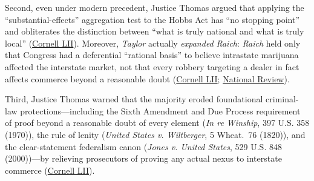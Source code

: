 \documentclass[12pt]{article}
\begin{document}
Second, even under modern precedent, Justice Thomas argued that applying the ``substantial-effects'' aggregation test to the Hobbs Act has ``no stopping point'' and obliterates the distinction between ``what is truly national and what is truly local'' (\href{https://www.law.cornell.edu/supremecourt/text/14-6166}{Cornell LII}). Moreover, \textit{Taylor} actually \textit{expanded} \textit{Raich}: \textit{Raich} held only that Congress had a deferential ``rational basis'' to believe intrastate marijuana affected the interstate market, not that every robbery targeting a dealer in fact affects commerce beyond a reasonable doubt (\href{https://www.law.cornell.edu/supremecourt/text/14-6166}{Cornell LII}; \href{https://www.nationalreview.com/bench-memos/loose-evidentiary-ends-raich-taylor-v-united-states}{National Review}).

Third, Justice Thomas warned that the majority eroded foundational criminal-law protections---including the Sixth Amendment and Due Process requirement of proof beyond a reasonable doubt of every element (\textit{In re Winship}, 397 U.S. 358 (1970)), the rule of lenity (\textit{United States v. Wiltberger}, 5 Wheat.\ 76 (1820)), and the clear-statement federalism canon (\textit{Jones v. United States}, 529 U.S. 848 (2000))---by relieving prosecutors of proving any actual nexus to interstate commerce (\href{https://www.law.cornell.edu/supremecourt/text/14-6166}{Cornell LII}).
\end{document}
